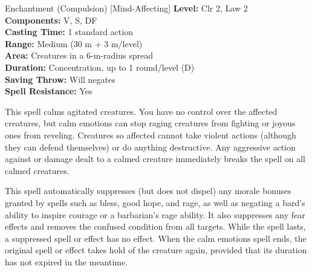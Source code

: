 {Enchantment (Compulsion) [Mind-Affecting]}
{
	\textbf{Level:}
	Clr 2, Law 2\\
	\textbf{Components:}
	V, S, DF\\
	\textbf{Casting Time:}
	1 standard action\\
	\textbf{Range:}
	Medium (30 m + 3 m/level)\\
	\textbf{Area:}
	Creatures in a 6-m-radius spread\\
	\textbf{Duration:}
	Concentration, up to 1 round/level (D)\\
	\textbf{Saving Throw:}
	Will negates\\
	\textbf{Spell Resistance:}
	Yes\\
}
{
	This spell calms agitated creatures. You have no control over the affected creatures, but calm emotions can stop raging creatures from fighting or joyous ones from reveling. Creatures so affected cannot take violent actions (although they can defend themselves) or do anything destructive. Any aggressive action against or damage dealt to a calmed creature immediately breaks the spell on all calmed creatures.

	This spell automatically suppresses (but does not dispel) any morale bonuses granted by spells such as bless, good hope, and rage, as well as negating a bard's ability to inspire courage or a barbarian's rage ability. It also suppresses any fear effects and removes the confused condition from all targets. While the spell lasts, a suppressed spell or effect has no effect. When the calm emotions spell ends, the original spell or effect takes hold of the creature again, provided that its duration has not expired in the meantime.

}
